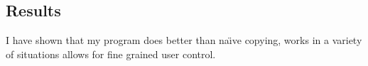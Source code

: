 \documentclass[12pt]{article}
\begin{document}
\subsection{Results}
I have shown that my program does better than na\"{\i}ve copying,
works in a variety of situations allows for fine grained user control.

\end{document}
